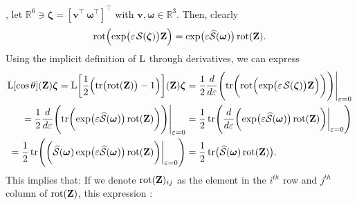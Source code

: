 , let $\mathbb{R}^6\ni\boldsymbol{\zeta} = [\mathbf{v}^\top\ \boldsymbol{\omega}^\top]^\top$ with $\mathbf{v}, \boldsymbol{\omega}\in\mathbb{R}^3$. Then, clearly
\begin{align}
    \rot\Bigl(\exp\bigl(\varepsilon\SL[\boldsymbol{\zeta}]\bigr)\mathbf{Z}\Bigr) = \exp\bigl(\varepsilon\widehat{\mathcal{S}}(\boldsymbol{\omega})\bigr)\rot(\mathbf{Z}). 
\end{align}
Using the implicit definition of $\operatorname{L}$ through derivatives, we can express
\begin{align}
     \Lop[\cos\theta](\mathbf{Z})\boldsymbol{\zeta}=\Lop\biggl[\frac{1}{2}\Bigl(\tr\bigl(\rot(\mathbf{Z})\bigr)-1\Bigr)\biggr](\mathbf{Z})\boldsymbol{\zeta} &= \frac{1}{2}\frac{d}{d\varepsilon}\Biggl(\tr\biggl(\rot\Bigl(\exp\bigl(\varepsilon\SL[\boldsymbol{\zeta}]\bigr)\mathbf{Z}\Bigr)\biggr)\Biggr)\Biggr|_{\varepsilon=0} \nonumber\\
     = \frac{1}{2}\frac{d}{d\varepsilon}\Biggl(\tr\biggl(\exp\bigl(\varepsilon\widehat{\mathcal{S}}(\boldsymbol{\omega})\bigr)\rot(\mathbf{Z})\biggr)\Biggr)\Biggr|_{\varepsilon=0}
     &= \frac{1}{2}\tr\Biggl(\frac{d}{d\varepsilon}\biggl(\exp\bigl(\varepsilon\widehat{\mathcal{S}}(\boldsymbol{\omega})\bigr)\rot(\mathbf{Z})\biggr)\biggr|_{\varepsilon=0}\Biggr) \nonumber\\
     = \frac{1}{2}\tr\Biggl(\biggl(\widehat{\mathcal{S}}(\boldsymbol{\omega})\exp\bigl(\varepsilon\widehat{\mathcal{S}}(\boldsymbol{\omega})\bigr)\rot(\mathbf{Z})\biggr)\biggr|_{\varepsilon=0}\Biggr)
     &= \frac{1}{2}\tr\bigl(\widehat{\mathcal{S}}(\boldsymbol{\omega})\rot(\mathbf{Z})\bigr). \label{eq:appendix-L-cos-theta-implicit-defn}
\end{align}
This implies that:
If we denote $\operatorname{rot}(\mathbf{Z})_{ij}$ as the element in the $i^{th}$ row and $j^{th}$ column of $\operatorname{rot}(\mathbf{Z})$, this expression :
